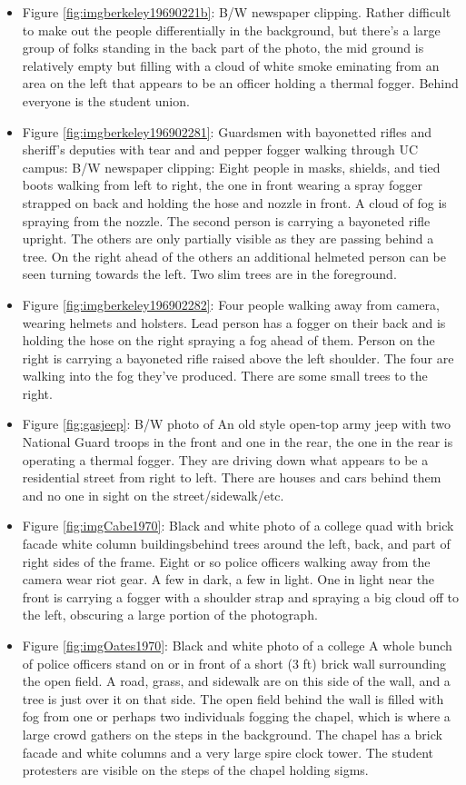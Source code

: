 \documentclass[
  11pt,
]{krantz}
\begin{document}
\begin{itemize}
\item
  Figure \ref{fig:imgberkeley19690221b}: B/W newspaper clipping. Rather difficult to make out the people differentially in the background, but there's a large group of folks standing in the back part of the photo, the mid ground is relatively empty but filling with a cloud of white smoke eminating from an area on the left that appears to be an officer holding a thermal fogger. Behind everyone is the student union.
\item
  Figure \ref{fig:imgberkeley196902281}: Guardsmen with bayonetted rifles and sheriff's deputies with tear and and pepper fogger walking through UC campus: B/W newspaper clipping: Eight people in masks, shields, and tied boots walking from left to right, the one in front wearing a spray fogger strapped on back and holding the hose and nozzle in front. A cloud of fog is spraying from the nozzle. The second person is carrying a bayoneted rifle upright. The others are only partially visible as they are passing behind a tree. On the right ahead of the others an additional helmeted person can be seen turning towards the left. Two slim trees are in the foreground.
\item
  Figure \ref{fig:imgberkeley196902282}: Four people walking away from camera, wearing helmets and holsters. Lead person has a fogger on their back and is holding the hose on the right spraying a fog ahead of them. Person on the right is carrying a bayoneted rifle raised above the left shoulder. The four are walking into the fog they've produced. There are some small trees to the right.
\item
  Figure \ref{fig:gasjeep}: B/W photo of An old style open-top army jeep with two National Guard troops in the front and one in the rear, the one in the rear is operating a thermal fogger. They are driving down what appears to be a residential street from right to left. There are houses and cars behind them and no one in sight on the street/sidewalk/etc.
\item
  Figure \ref{fig:imgCabe1970}: Black and white photo of a college quad with brick facade white column buildingsbehind trees around the left, back, and part of right sides of the frame. Eight or so police officers walking away from the camera wear riot gear. A few in dark, a few in light. One in light near the front is carrying a fogger with a shoulder strap and spraying a big cloud off to the left, obscuring a large portion of the photograph.
\item
  Figure \ref{fig:imgOates1970}: Black and white photo of a college A whole bunch of police officers stand on or in front of a short (3 ft) brick wall surrounding the open field. A road, grass, and sidewalk are on this side of the wall, and a tree is just over it on that side. The open field behind the wall is filled with fog from one or perhaps two individuals fogging the chapel, which is where a large crowd gathers on the steps in the background. The chapel has a brick facade and white columns and a very large spire clock tower. The student protesters are visible on the steps of the chapel holding sigms.

\end{itemize}
\end{document}
